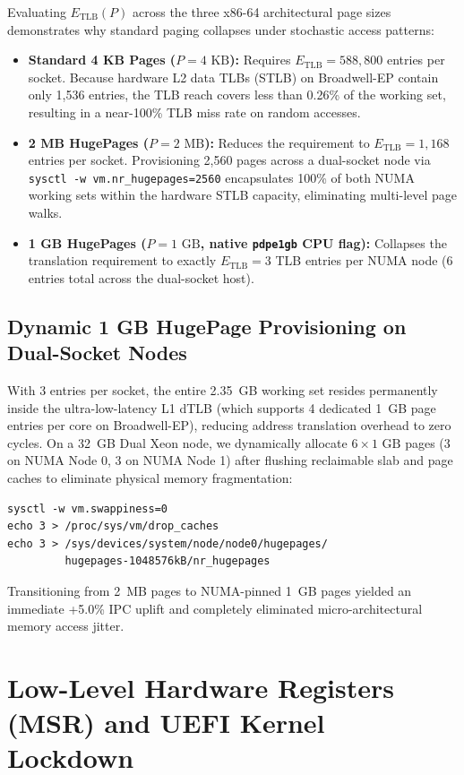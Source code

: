 \documentclass[journal]{IEEEtran}
\begin{document}
Evaluating $E_{\text{TLB}}(P)$ across the three x86-64 architectural page sizes demonstrates why standard paging collapses under stochastic access patterns:
\begin{itemize}
\item \textbf{Standard 4 KB Pages ($P = 4\text{ KB}$):} Requires $E_{\text{TLB}} = 588,800$ entries per socket. Because hardware L2 data TLBs (STLB) on Broadwell-EP contain only 1,536 entries, the TLB reach covers less than 0.26\% of the working set, resulting in a near-100\% TLB miss rate on random accesses.
\item \textbf{2 MB HugePages ($P = 2\text{ MB}$):} Reduces the requirement to $E_{\text{TLB}} = 1,168$ entries per socket. Provisioning 2,560 pages across a dual-socket node via \texttt{sysctl -w vm.nr\_hugepages=2560} encapsulates 100\% of both NUMA working sets within the hardware STLB capacity, eliminating multi-level page walks.
\item \textbf{1 GB HugePages ($P = 1\text{ GB}$, native \texttt{pdpe1gb} CPU flag):} Collapses the translation requirement to exactly $E_{\text{TLB}} = 3$ TLB entries per NUMA node (6 entries total across the dual-socket host).
\end{itemize}

\subsection{Dynamic 1 GB HugePage Provisioning on Dual-Socket Nodes}
With 3 entries per socket, the entire 2.35~GB working set resides permanently inside the ultra-low-latency L1 dTLB (which supports 4 dedicated 1~GB page entries per core on Broadwell-EP), reducing address translation overhead to zero cycles. On a 32~GB Dual Xeon node, we dynamically allocate $6\times 1\text{ GB}$ pages (3 on NUMA Node 0, 3 on NUMA Node 1) after flushing reclaimable slab and page caches to eliminate physical memory fragmentation:
\begin{verbatim}
sysctl -w vm.swappiness=0
echo 3 > /proc/sys/vm/drop_caches
echo 3 > /sys/devices/system/node/node0/hugepages/
         hugepages-1048576kB/nr_hugepages
\end{verbatim}

Transitioning from 2~MB pages to NUMA-pinned 1~GB pages yielded an immediate +5.0\% IPC uplift and completely eliminated micro-architectural memory access jitter.

\section{Low-Level Hardware Registers (MSR) and UEFI Kernel Lockdown}
\end{document}
